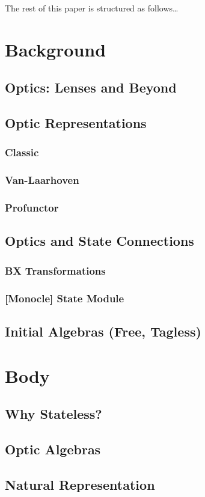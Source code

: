 \documentclass[a4paper]{report}
\begin{document}
The rest of this paper is structured as follows\ldots

\chapter{Background}
\section{Optics: Lenses and Beyond}
\section{Optic Representations}
\subsection{Classic}
\subsection{Van-Laarhoven}
\subsection{Profunctor}
\section{Optics and State Connections}
\subsection{BX Transformations}
\subsection{[Monocle] State Module}
\section{Initial Algebras (Free, Tagless)}

\chapter{Body}
\section{Why Stateless?}
\section{Optic Algebras}
\section{Natural Representation}
\end{document}
